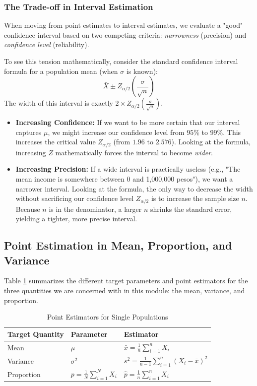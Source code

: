 \documentclass{article}
\begin{document}
\subsubsection{The Trade-off in Interval Estimation}
When moving from point estimates to interval estimates, we evaluate a "good" confidence interval based on two competing criteria: \emph{narrowness} (precision) and \emph{confidence level} (reliability).

To see this tension mathematically, consider the standard confidence interval formula for a population mean (when $\sigma$ is known):
$$ \bar{X} \pm Z_{\alpha/2} \left( \frac{\sigma}{\sqrt{n}} \right) $$
The width of this interval is exactly $2 \times Z_{\alpha/2} \left( \frac{\sigma}{\sqrt{n}} \right)$.

\begin{itemize}
    \item \textbf{Increasing Confidence:} If we want to be more certain that our interval captures $\mu$, we might increase our confidence level from $95\%$ to $99\%$. This increases the critical value $Z_{\alpha/2}$ (from $1.96$ to $2.576$). Looking at the formula, increasing $Z$ mathematically forces the interval to become \emph{wider}.
    \item \textbf{Increasing Precision:} If a wide interval is practically useless (e.g., "The mean income is somewhere between 0 and 1,000,000 pesos"), we want a narrower interval. Looking at the formula, the only way to decrease the width without sacrificing our confidence level $Z_{\alpha/2}$ is to increase the sample size $n$. Because $n$ is in the denominator, a larger $n$ shrinks the standard error, yielding a tighter, more precise interval.
\end{itemize}

\subsection{Point Estimation in Mean, Proportion, and Variance}

Table \ref{tab:pointests} summarizes the different target parameters and point estimators for the three quantities we are concerned with in this module: the mean, variance, and proportion.

\begin{table}[h]
\centering
\begin{tabular}{lll}
\hline
\textbf{Target Quantity} & \textbf{Parameter} & \textbf{Estimator} \\ \hline
Mean & $\mu$ & $\bar{x} = \frac{1}{n}\sum_{i=1}^{n}X_i$ \\
Variance & $\sigma^2$ & $s^2 = \frac{1}{n-1}\sum_{i=1}^{n}(X_i - \bar{x})^2$ \\
Proportion & $p = \frac{1}{N}\sum_{i=1}^{N}X_i$ & $\hat{p} = \frac{1}{n}\sum_{i=1}^{n}X_i$ \\ 
\hline \hline
\end{tabular}
\caption{\label{tab:pointests} Point Estimators for Single Populations}
\end{table}
\end{document}

